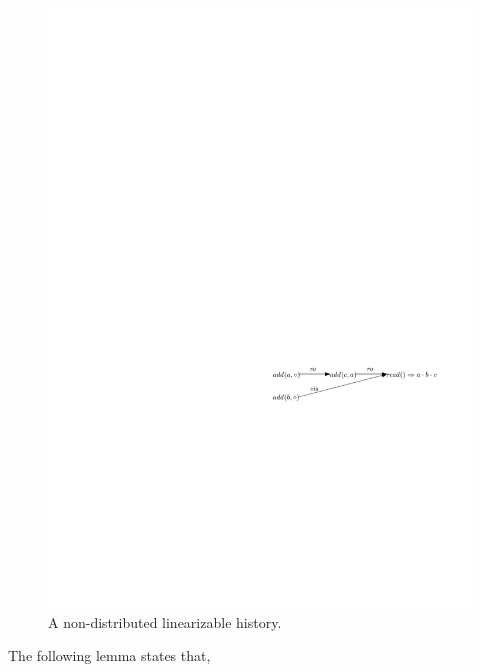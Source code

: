 \begin{figure}[t]
  \centering
  \includegraphics[width=0.6 \textwidth]{figures/PIC-Example-NonLinHis.pdf}
  \caption{A non-distributed linearizable history.}
  \label{fig:a non-distributed linearizable history}
\end{figure}

The following lemma states that, 



